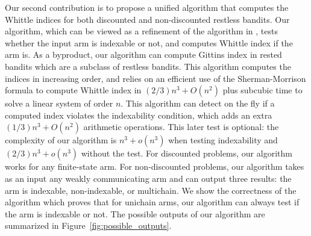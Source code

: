 Our second contribution is to propose a unified algorithm that computes the Whittle indices for both discounted and non-discounted restless bandits. Our algorithm, which can be viewed as a refinement of the algorithm in \cite{akbarzadeh2020conditions}, tests whether the input arm is indexable or not, and computes Whittle index if the arm is. As a byproduct, our algorithm can compute Gittins index in rested bandits which are a subclass of restless bandits.  This algorithm computes the indices in increasing order, and relies on an efficient use of the Sherman-Morrison formula to compute Whittle index in $(2/3)n^3 + O(n^2)$ plus subcubic time \citep{strassen1969gaussian} to solve a linear system of order $n$.
This algorithm can detect on the fly if a computed index violates the indexability condition, which adds an extra $(1/3)n^3+O(n^2)$ arithmetic operations. This later test is optional: the complexity of our algorithm is $n^3+o(n^3)$ when testing indexability and $(2/3)n^3 +o(n^3)$ without the test. For discounted problems, our algorithm works for any finite-state arm.  For non-discounted problems, our algorithm takes as an input any weakly communicating arm and can output three results: the arm is indexable, non-indexable, or multichain. %
We show the correctness of the algorithm which proves that for unichain arms, our algorithm can always test if the arm is indexable or not. The possible outputs of our algorithm are summarized in Figure~\ref{fig:possible_outputs}.

